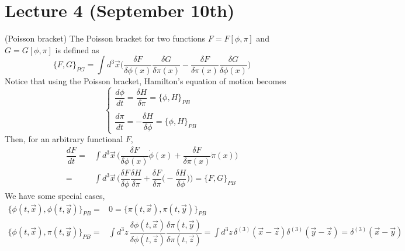 \section{Lecture 4 (September 10th)}
\begin{defi}
(Poisson bracket) The Poisson bracket for two functions $F=F[\phi ,\pi ]$ and $G=G[\phi ,\pi ]$ is defined as
	\[\{F,G\}_{PG}=\int d^3\vec{x}\Big(\dfrac{\delta F}{\delta \phi (x)}\dfrac{\delta G}{\delta \pi (x)}-\dfrac{\delta F}{\delta \pi (x)}\dfrac{\delta G}{\delta \phi (x)}\Big)\]
Notice that using the Poisson bracket, Hamilton's equation of motion becomes 
\[\begin{cases}
\dfrac{d \phi }{d t}=\dfrac{\delta H}{\delta \pi }=\{\phi ,H\}_{PB}\\\\
\dfrac{d \pi }{d t}=-\dfrac{\delta H}{\delta \phi }=\{\phi ,H\}_{PB}
\end{cases}\]
Then, for an arbitrary functional $F$,
\[\begin{align*}
	\dfrac{d F}{d t}=&\int d^3\vec{x}\,\Big(\dfrac{\delta F}{\delta \phi (x)}\dot{\phi }(x)+\dfrac{\delta F}{\delta \pi (x)}\dot{\pi }(x)\Big)\\
	=&\int d^3\vec{x}\,\Big(\dfrac{\delta F}{\delta \phi }\dfrac{\delta H}{\delta \pi }+\dfrac{\delta F}{\delta \pi }\Big(-\dfrac{\delta H}{\delta \phi }\Big)\Big)=\{F,G\}_{PB}
\end{align*}\]
We have some special cases,
\[\begin{align*}
	\{\phi (t,\vec{x}),\phi (t,\vec{y})\}_{PB}=&0=\{\pi (t,\vec{x}),\pi (t,\vec{y})\}_{PB}\\
	\{\phi (t,\vec{x}),\pi (t,\vec{y})\}_{PB}=&\int d^3z\,\dfrac{\delta \phi (t,\vec{x})}{\delta \phi (t,\vec{z})}\dfrac{\delta \pi (t,\vec{y})}{\delta \pi (t,\vec{z})}=\int d^3z\,\delta ^{(3)}(\vec{x}-\vec{z})\delta ^{(3)}(\vec{y}-\vec{z})=\delta ^{(3)}(\vec{x}-\vec{y})
\end{align*}\]
\end{defi}
\vspace{2ex}
